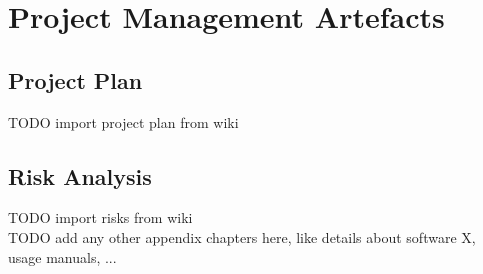 \documentclass[a4paper]{report}
\begin{document}
\chapter{Project Management Artefacts}
\section{Project Plan}
TODO import project plan from wiki\\

\section{Risk Analysis}
TODO import risks from wiki\\



TODO add any other appendix chapters here, like details about software X, usage manuals, ...\\
\end{document}
